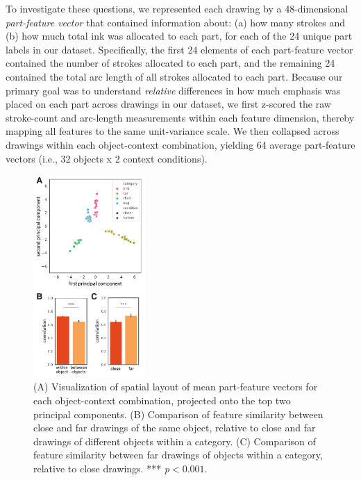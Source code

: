 \documentclass[10pt,letterpaper]{article}
\newcommand{\kushin}[1]{{\color{orange}{[kushin: #1]}}}
\begin{document}
To investigate these questions, we represented each drawing by a 48-dimensional \textit{part-feature vector} that contained information about: (a) how many strokes and (b) how much total ink was allocated to each part, for each of the 24 unique part labels in our dataset. 
Specifically, the first 24 elements of each part-feature vector contained the number of strokes allocated to each part, and the remaining 24 contained the total arc length of all strokes allocated to each part. 
Because our primary goal was to understand \textit{relative} differences in how much emphasis was placed on each part across drawings in our dataset, we first z-scored the raw stroke-count and arc-length measurements within each feature dimension, thereby mapping all features to the same unit-variance scale. 
We then collapsed across drawings within each object-context combination, yielding 64 average part-feature vectors (i.e., 32 objects x 2 context conditions). 

\begin{figure}[ht]
\centering
\includegraphics[width=0.38\textwidth]{figures/7_part_emphasis.pdf}
\caption{(A) Visualization of spatial layout of mean part-feature vectors for each object-context combination, projected onto the top two principal components. (B) Comparison of feature similarity between close and far drawings of the same object, relative to close and far drawings of different objects within a category. (C) Comparison of feature similarity between far drawings of objects within a category, relative to close drawings. *** \textit{p}$<0.001.$}
\label{part_emphasis}
\end{figure}
\end{document}
